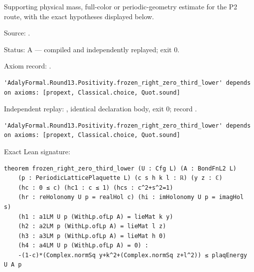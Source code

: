 \begin{theorem}[bp-468]
\label{bp-468}
\leanok
Supporting physical mass, full-color or periodic-geometry estimate for the P2 route, with the exact hypotheses displayed below.

\par Source: \texttt{}.
\par Status: A — compiled and independently replayed; exit 0.
\par Axiom record: \texttt{}.
\begin{verbatim}
'AdalyFormal.Round13.Positivity.frozen_right_zero_third_lower' depends on axioms: [propext, Classical.choice, Quot.sound]
\end{verbatim}
\par Independent replay: \texttt{}, identical declaration body, exit 0; record \texttt{}.
\begin{verbatim}
'AdalyFormal.Round13.Positivity.frozen_right_zero_third_lower' depends on axioms: [propext, Classical.choice, Quot.sound]
\end{verbatim}
\par Exact Lean signature:
\begin{verbatim}
theorem frozen_right_zero_third_lower (U : Cfg L) (A : BondFnL2 L)
    (p : PeriodicLatticePlaquette L) (c s h k l : ℝ) (y z : ℂ)
    (hc : 0 ≤ c) (hc1 : c ≤ 1) (hcs : c^2+s^2=1)
    (hr : reHolonomy U p = realHol c) (hi : imHolonomy U p = imagHol s)
    (h1 : a1LM U p (WithLp.ofLp A) = lieMat k y)
    (h2 : a2LM p (WithLp.ofLp A) = lieMat l z)
    (h3 : a3LM p (WithLp.ofLp A) = lieMat h 0)
    (h4 : a4LM U p (WithLp.ofLp A) = 0) :
    -(1-c)*(Complex.normSq y+k^2+(Complex.normSq z+l^2)) ≤ plaqEnergy U A p
\end{verbatim}
\end{theorem}

